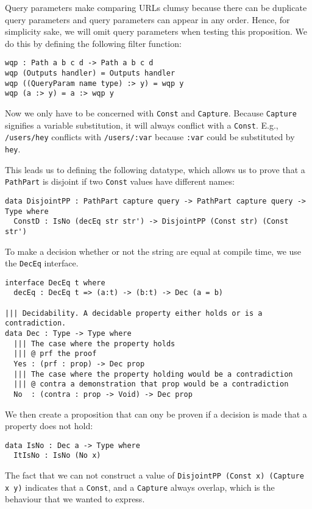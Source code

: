 \documentclass[12pt,a4paper]{article}
\begin{document}
Query parameters make comparing URLs clumsy because there can be duplicate query parameters and query parameters can appear in any order. Hence, for simplicity sake, we will omit query parameters when testing this proposition.  We do this by defining the following filter function:

\begin{verbatim}
wqp : Path a b c d -> Path a b c d
wqp (Outputs handler) = Outputs handler
wqp ((QueryParam name type) :> y) = wqp y
wqp (a :> y) = a :> wqp y
\end{verbatim}

Now we only have to be concerned with \texttt{Const} and \texttt{Capture}. Because \texttt{Capture} signifies a variable substitution, it will always conflict with a \texttt{Const}. E.g.,  \texttt{/users/hey} conflicts with \texttt{/users/:var} because \texttt{:var} could be substituted by \texttt{hey}.

This leads us to defining the following datatype, which allows us to prove that a \texttt{PathPart} is disjoint if  two \texttt{Const} values have different names:
\begin{verbatim}
data DisjointPP : PathPart capture query -> PathPart capture query -> Type where
  ConstD : IsNo (decEq str str') -> DisjointPP (Const str) (Const str')
\end{verbatim}

To make a decision whether or not the string are equal at compile time, we use the \texttt{DecEq} interface.
\begin{verbatim}
interface DecEq t where
  decEq : DecEq t => (a:t) -> (b:t) -> Dec (a = b)

||| Decidability. A decidable property either holds or is a contradiction.
data Dec : Type -> Type where
  ||| The case where the property holds
  ||| @ prf the proof
  Yes : (prf : prop) -> Dec prop
  ||| The case where the property holding would be a contradiction
  ||| @ contra a demonstration that prop would be a contradiction
  No  : (contra : prop -> Void) -> Dec prop
\end{verbatim}
We then create a proposition that can ony be proven if  a decision is made that a property does not hold:
\begin{verbatim}
data IsNo : Dec a -> Type where
  ItIsNo : IsNo (No x)
\end{verbatim}


The fact that we can not construct a value of \texttt{DisjointPP (Const x) (Capture x y)} indicates that a \texttt{Const}, and a \texttt{Capture} always overlap, which is the behaviour that we wanted to express.
\end{document}
